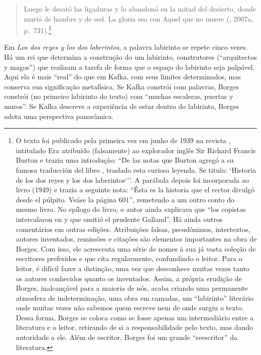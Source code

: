 \begin{quote}
Luego le desató las ligaduras y lo abandonó en la mitad del desierto,
donde murió de hambre y de sed. La gloria sea con Aquel que no muere
(, 2007a, p.~731).\footnote{O texto foi publicado pela primeira
  vez em junho de 1939 na revista {}, intitulado {} Era atribuído (falsamente) ao explorador inglês Sir
  Richard Francis Burton e trazia uma introdução: ``De las notas que
  Burton agregó a su famosa traducción del libro {}, traslado esta curiosa leyenda. Se titula: `Historia de los
  dos reyes y los dos laberintos`''. A parábola depois foi incorporada
  ao livro {} (1949) e trazia a seguinte nota: ``Ésta es la
  historia que el rector divulgó desde el púlpito. Veáse la página
  601'', remetendo a um outro conto do mesmo livro. No epílogo do livro,
  o autor ainda explicava que ``los copistas intercalaron en {} y que omitió el prudente Galland''. Há ainda outros
  comentários em outras edições. Atribuições falsas, pseudônimos,
  intertextos, autores inventados, remissões e citações são elementos
  importantes na obra de Borges. Com isso, ele acrescenta uma série de
  nomes à sua já vasta coleção de escritores preferidos e que cita
  regularmente, confundindo o leitor. Para o leitor, é difícil fazer a
  distinção, uma vez que desconhece muitas vezes tanto os autores
  conhecidos quanto os inventados. Assim, a própria erudição de Borges,
  inalcançável para a maioria de nós, acaba criando uma permanente
  atmosfera de indeterminação, uma obra em camadas, um ``labirinto''
  literário onde muitas vezes não sabemos quem escreve nem de onde
  surgiu o texto. Dessa forma, Borges se coloca como se fosse apenas um
  intermediário entre a literatura e o leitor, retirando de si a
  responsabilidade pelo texto, mas dando autoridade a ele. Além de
  escritor, Borges foi um grande ``reescritor'' da literatura.}
\end{quote}

Em \emph{Los dos reyes y los dos laberintos}, a palavra labirinto se
repete cinco vezes. Há um rei que determina a construção do um
labirinto, construtores (``arquitectos y magos'') que realizam a tarefa
de forma que o espaço do labirinto seja palpável. Aqui ela é mais
``real'' do que em Kafka, com seus limites determinados, mas conserva
sua significação metafísica. Se Kafka constrói com palavras, Borges
constrói (no primeiro labirinto do texto) com ``muchas escaleras,
puertas y muros''. Se Kafka descreve a experiência de estar dentro do
labirinto, Borges adota uma perspectiva panorâmica.


